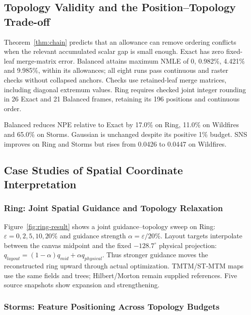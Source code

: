 \documentclass[review]{vgtc}
\begin{document}
\subsection{Topology Validity and the Position--Topology Trade-off}\label{sec:relaxation-results}
Theorem~\ref{thm:chain} predicts that an allowance can remove ordering conflicts when the relevant accumulated scalar gap is small enough. Exact has zero fixed-leaf merge-matrix error. Balanced attains maximum NMLE of 0, 0.982\%, 4.421\% and 9.985\%, within its allowances; all eight runs pass continuous and raster checks without collapsed anchors. Checks use retained-leaf merge matrices, including diagonal extremum values. Ring requires checked joint integer rounding in 26 Exact and 21 Balanced frames, retaining its 196 positions and continuous order.

Balanced reduces NPE relative to Exact by 17.0\% on Ring, 11.0\% on Wildfires and 65.0\% on Storms. Gaussian is unchanged despite its positive 1\% budget. SNS improves on Ring and Storms but rises from 0.0426 to 0.0447 on Wildfires. 

\subsection{Case Studies of Spatial Coordinate Interpretation}
\subsubsection{Ring: Joint Spatial Guidance and Topology Relaxation}

Figure~\ref{fig:ring-result} shows a joint guidance--topology sweep on Ring: $\varepsilon=0,2,5,10,20\%$ and guidance strength $\alpha=\varepsilon/20\%$. Layout targets interpolate between the canvas midpoint and the fixed $-128.7^\circ$ physical projection: $q_{layout}=(1-\alpha)q_{mid}+\alpha q_{physical}$. Thus stronger guidance moves the reconstructed ring upward through actual optimization. TMTM/ST-MTM maps use the same fields and trees; Hilbert/Morton remain supplied references. Five source snapshots show expansion and strengthening.

\subsubsection{Storms: Feature Positioning Across Topology Budgets}
\end{document}
